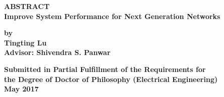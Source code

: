 \begin{center}
 {\large \bf ABSTRACT } \\ \vspace{0.2in}
 {\large \bf Improve System Performance for Next Generation Networks} \\ \vspace{0.2in}

 {\large \bf by } \\ \vspace{0.3in}
 {\large \bf Tingting Lu} \\ \vspace{0.3in}
 {\large \bf Advisor: Shivendra S. Panwar}  \\ \vspace{0.2in}

 {\bf Submitted in Partial Fulfillment of the Requirements for\\
 the Degree of Doctor of Philosophy (Electrical Engineering)
 } \\
 \vspace{0.2in}
 {\bf May 2017} \\
 \vspace{0.2in}

\end{center}

